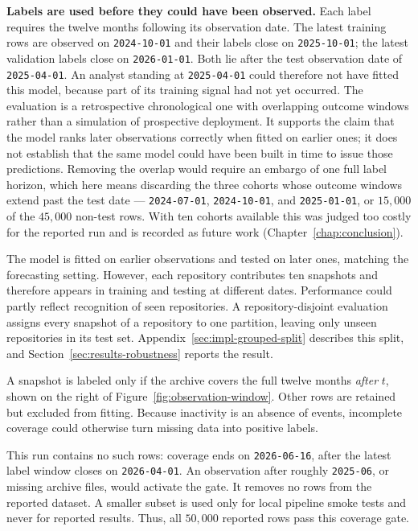 \label{sec:method-label-availability}
\textbf{Labels are used before they could have been observed.} Each label
requires the twelve months following its observation date. The latest training
rows are observed on \texttt{2024-10-01} and their labels close on
\texttt{2025-10-01}; the latest validation labels close on \texttt{2026-01-01}.
Both lie after the test observation date of \texttt{2025-04-01}. An analyst
standing at \texttt{2025-04-01} could therefore not have fitted this model,
because part of its training signal had not yet occurred. The evaluation is a
retrospective chronological one with overlapping outcome windows rather than a
simulation of prospective deployment. It supports the claim that the model ranks
later observations correctly when fitted on earlier ones; it does not establish
that the same model could have been built in time to issue those predictions.
Removing the overlap would require an embargo of one full label horizon, which
here means discarding the three cohorts whose outcome windows extend past the
test date --- \texttt{2024-07-01}, \texttt{2024-10-01}, and \texttt{2025-01-01},
or \(15{,}000\) of the \(45{,}000\) non-test rows. With ten cohorts available
this was judged too costly for the reported run and is recorded as future work
(Chapter~\ref{chap:conclusion}).

The model is fitted on earlier observations and tested on later ones, matching
the forecasting setting. However, each repository contributes ten snapshots and
therefore appears in training and testing at different dates. Performance could
partly reflect recognition of seen repositories. A repository-disjoint
evaluation assigns every snapshot of a repository to one partition, leaving
only unseen repositories in its test set. Appendix~\ref{sec:impl-grouped-split}
describes this split, and Section~\ref{sec:results-robustness} reports the result.

A snapshot is labeled only if the archive covers the full twelve months \emph{after}
\(t\), shown on the right of Figure~\ref{fig:observation-window}. Other rows are
retained but excluded from fitting. Because inactivity is an absence of events,
incomplete coverage could otherwise turn missing data into positive labels.

This run contains no such rows: coverage ends on \texttt{2026-06-16}, after the
latest label window closes on \texttt{2026-04-01}. An observation after roughly
\texttt{2025-06}, or missing archive files, would activate the gate. It removes
no rows from the reported dataset. A smaller subset is
used only for local pipeline smoke tests and never for reported results.
Thus, all \(50{,}000\) reported rows pass this coverage gate.

